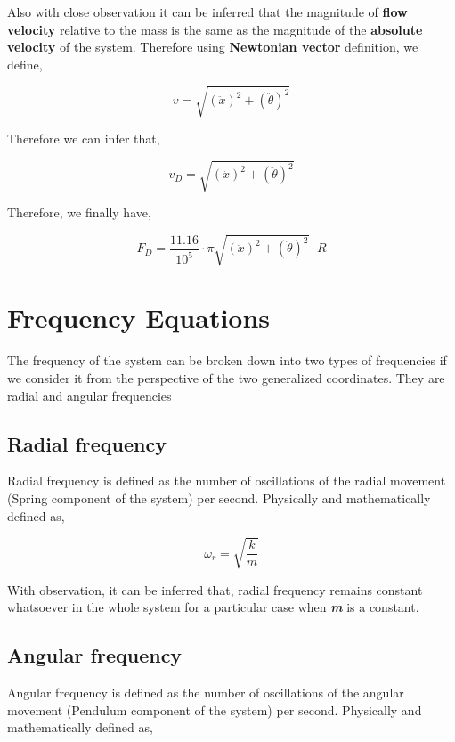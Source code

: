     {Also with close observation it can be inferred that the magnitude of \textbf{flow velocity} relative to the mass is the same as the magnitude of the \textbf{absolute velocity} of the system. Therefore using \textbf{Newtonian vector} definition, we define,}
            
        $$v = \sqrt{(\ddot{x})^2 + (\ddot{\theta})^2}$$
        
    {Therefore we can infer that,}
        
        $$v_D = \sqrt{(\ddot{x})^2 + (\ddot{\theta})^2}$$
            
    {Therefore, we finally have,}
            
        $$F_D = \frac{11.16}{10^{5}}\cdot\pi\sqrt{(\ddot{x})^2 + (\ddot{\theta})^2}\cdot R$$
            
\section{{Frequency Equations}}
            
    {The frequency of the system can be broken down into two types of frequencies if we consider it from the perspective of the two generalized coordinates. They are radial and angular frequencies}
            
    \subsection{{Radial frequency}}
                
        {Radial frequency is defined as the number of oscillations of the radial movement (Spring component of the system) per second. Physically and mathematically defined as,}
                
            $$\omega_r = \sqrt{\frac{k}{m}}$$
                
        {With observation, it can be inferred that, radial frequency remains constant whatsoever in the whole system for a particular case when \textit{\textbf{m}} is a constant.}
            
    \subsection{{Angular frequency}}
                
        {Angular frequency is defined as the number of oscillations of the angular movement (Pendulum component of the system) per second. Physically and mathematically defined as,}
                

